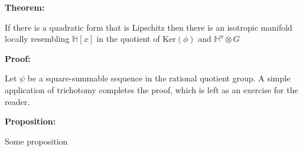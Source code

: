 \documentclass{amsart}
\newcommand{\mycommand}[2]{%
    \par\addvspace{\baselineskip}
    \noindent
    \begin{minipage}[t]{0.19\textwidth}
        \begin{flushright}
            \textbf{#1}
        \end{flushright}
    \end{minipage}
    \hfill
    \begin{minipage}[t]{0.79\textwidth}
        \begin{flushleft}
            #2
        \end{flushleft}
    \end{minipage}
    \par\addvspace{\baselineskip}
}
\begin{document}
\lipsum[66]

\mycommand{Theorem:}{If there is a quadratic form that is Lipschitz then there is an isotropic manifold locally resembling $\mathbb{H}[x]$ in the quotient of Ker$({\phi})$ and $\mathbb{H}^{n}\otimes G$}

\mycommand{Proof:}{Let $\psi$ be a square-summable sequence in the rational quotient group. A simple application of trichotomy completes the proof, which is left as an exercise for the reader.}

\mycommand{Proposition:}{Some proposition}

\lipsum[75]
\end{document}
